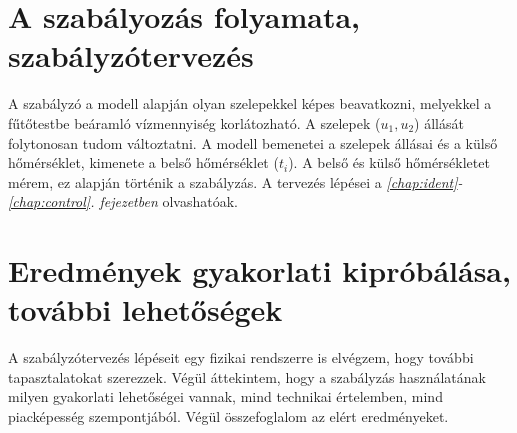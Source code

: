 \section*{A szabályozás folyamata, szabályzótervezés}
A szabályzó a  modell alapján olyan szelepekkel képes beavatkozni, melyekkel a fűtőtestbe beáramló vízmennyiség korlátozható. A szelepek ($u_1, u_2$) állását folytonosan tudom változtatni. A modell bemenetei a szelepek állásai és a külső hőmérséklet, kimenete a belső hőmérséklet ($t_i$).  A belső és külső hőmérsékletet mérem, ez alapján történik a szabályzás. 
%
A tervezés lépései a \textit{\ref{chap:ident}-\ref{chap:control}. fejezetben} olvashatóak.
%
%
%
\section*{Eredmények gyakorlati kipróbálása, további lehetőségek}
%
A szabályzótervezés lépéseit egy fizikai rendszerre is elvégzem, hogy további tapasztalatokat szerezzek. Végül áttekintem, hogy a szabályzás használatának milyen gyakorlati lehetőségei vannak, mind technikai értelemben, mind piacképesség szempontjából. Végül összefoglalom az elért eredményeket.












